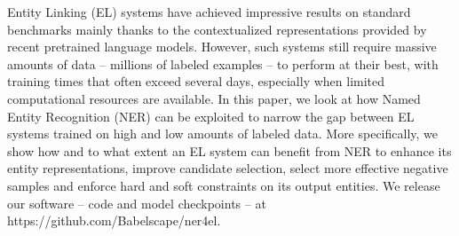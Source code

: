 Entity Linking (EL) systems have achieved impressive results on standard benchmarks mainly thanks to the contextualized representations provided by recent pretrained language models. However, such systems still require massive amounts of data -- millions of labeled examples -- to perform at their best, with training times that often exceed several days, especially when limited computational resources are available. In this paper, we look at how Named Entity Recognition (NER) can be exploited to narrow the gap between EL systems trained on high and low amounts of labeled data. More specifically, we show how and to what extent an EL system can benefit from NER to enhance its entity representations, improve candidate selection, select more effective negative samples and enforce hard and soft constraints on its output entities. We release our software -- code and model checkpoints -- at https://github.com/Babelscape/ner4el.
